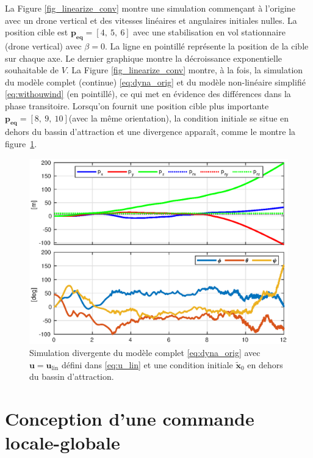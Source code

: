 La Figure \ref{fig_linearize_conv} montre une simulation commençant à l'origine avec un drone vertical et des vitesses linéaires et angulaires initiales nulles. La position cible est $\boldsymbol{p_{\text{eq}}} = [4,~5,~6]$ avec une stabilisation en vol stationnaire (drone vertical) avec $\beta = 0$. La ligne en pointillé représente la position de la cible sur chaque axe. Le dernier graphique montre la décroissance exponentielle souhaitable de $V$.
La Figure \ref{fig_linearize_conv} montre, à la fois, la simulation du modèle complet (continue) \eqref{eq:dyna_orig} et du modèle non-linéaire simplifié \eqref{eq:withouwind} (en pointillé), ce qui met en évidence des différences dans la phase transitoire.
Lorsqu'on fournit une position cible plus importante $\boldsymbol{p_{\text{eq}}} =[8,~9,~10]$(avec la même orientation), la condition initiale se situe en dehors du bassin d'attraction et une divergence apparaît, comme le montre la figure~\ref{fig_linearize_div}.

\begin{figure}[ht!]
    \centering
    \includegraphics[trim=0cm 0cm 0cm 0cm,clip,width=0.8\columnwidth]{figures/diverge2.eps}
    \caption{Simulation divergente du modèle complet \eqref{eq:dyna_orig} avec $\boldsymbol{u} = \boldsymbol{u}_{\text{lin}}$ défini dans 
    \eqref{eq:u_lin} et une condition initiale $\tilde{ \boldsymbol{x}}_0$ en dehors du bassin d'attraction.}
    \label{fig_linearize_div}
\end{figure}



\section{Conception d'une commande locale-globale}
\label{sec:ctrl_hyste}
 
